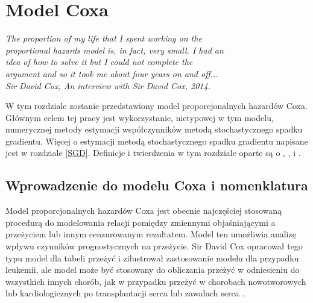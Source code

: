 \chapter{Model Coxa}
\begin{flushright}
\textit{The proportion of my life that I spent working on the \\ 
proportional hazards model is, in fact, very small. I had an \\
 idea of how to solve it but I could not complete the \\
  argument and so it took me about four years on and off... \\
Sir David Cox, An interview with Sir David Cox, 2014.
}
\end{flushright}


W tym rozdziale zostanie przedstawiony model proporcjonalnych hazardów Coxa. Głównym celem tej pracy jest wykorzystanie, nietypowej w tym modelu, numerycznej metody estymacji współczynników metodą stochastycznego spadku gradientu. Więcej o estymacji metodą stochastycznego spadku gradientu napisane jest w rozdziale \ref{SGD}. Definicje i twierdzenia w tym rozdziale oparte są o \cite{cox}, \cite{ther}, \cite{assel} i \cite{burzyk1}.



\section{Wprowadzenie do modelu Coxa i nomenklatura}

Model proporcjonalnych hazardów Coxa \cite{cox} jest obecnie najczęściej stosowaną procedurą do modelowania relacji pomiędzy zmiennymi objaśniającymi a przeżyciem lub innym cenzurowanym rezultatem. Model ten umożliwia analizę wpływu czynników prognostycznych na przeżycie. Sir David Cox opracował tego typu model dla tabeli przeżyć i zilustrował zastosowanie modelu dla przypadku
leukemii, ale model może być stosowany do obliczania
przeżyć w odniesieniu do wszystkich innych chorób, jak
w przypadku przeżyć w chorobach nowotworowych lub
kardiologicznych po transplantacji serca lub zawałach
serca \cite{norwe}. 

